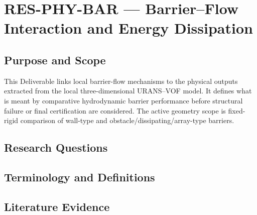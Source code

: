 
\section{RES-PHY-BAR --- Barrier–Flow Interaction and Energy Dissipation}
\label{sec:res-phy-bar}

\subsection{Purpose and Scope}
\label{sec:res-phy-bar-purpose}


This Deliverable links local barrier-flow mechanisms to the physical
outputs extracted from the local three-dimensional URANS--VOF model.
It defines what is meant by comparative hydrodynamic barrier
performance before structural failure or final certification are
considered. The active geometry scope is fixed-rigid comparison of
wall-type and obstacle/dissipating/array-type barriers.

\subsection{Research Questions}
\label{sec:res-phy-bar-research-questions}


\subsection{Terminology and Definitions}
\label{sec:res-phy-bar-definitions}


\subsection{Literature Evidence}
\label{sec:res-phy-bar-literature-evidence}

